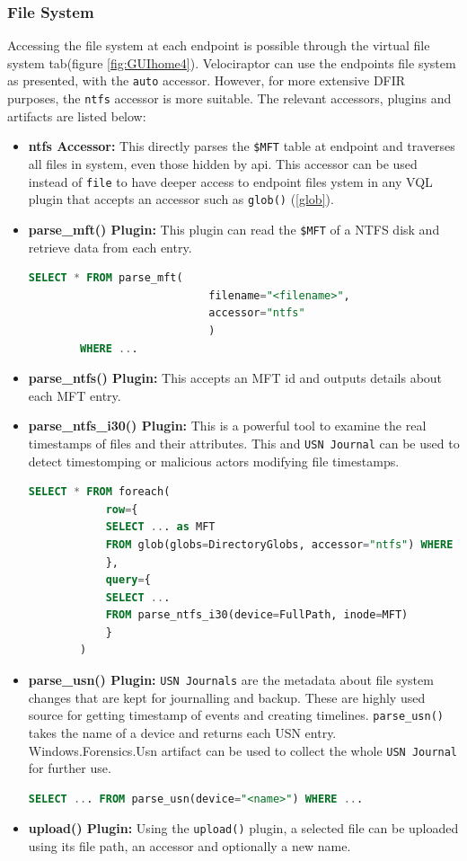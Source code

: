 \documentclass[a4paper, 11pt, oneside]{article} %
\begin{document}
\subsubsection{File System} 
Accessing the file system at each endpoint is possible through the virtual file system tab(figure \ref{fig:GUIhome4}). Velociraptor can use the endpoints file system as presented, with the \verb|auto| accessor. However, for more extensive DFIR purposes, the \verb|ntfs| accessor is more suitable. The relevant accessors, plugins and artifacts are listed  below:
\begin{itemize}
    \item \textbf{ntfs Accessor:} This directly parses the \verb|$MFT| table at endpoint and traverses all files in system, even those hidden by api. This accessor can be used instead of \verb|file| to have deeper access to endpoint files ystem in any VQL plugin that accepts an accessor such as \verb|glob()| (\ref{glob}).
    \item \textbf{parse\_mft() Plugin:} This plugin can read the \verb|$MFT| of a NTFS disk and retrieve data from each entry.
    \begin{lstlisting}[basicstyle=\ttfamily, breaklines=true, language=SQL]
        SELECT * FROM parse_mft(
                            filename="<filename>",
                            accessor="ntfs"
                            )
        WHERE ...
    \end{lstlisting}
    \item \textbf{parse\_ntfs() Plugin:} This accepts an MFT id and outputs details about each MFT entry.
    \item \textbf{parse\_ntfs\_i30() Plugin:} This is a powerful tool to examine the real timestamps of files and their attributes. This and \verb|USN Journal| can be used to detect timestomping or malicious actors modifying file timestamps.
    \begin{lstlisting}[basicstyle=\ttfamily, breaklines=true, language=SQL]
        SELECT * FROM foreach(
            row={
            SELECT ... as MFT
            FROM glob(globs=DirectoryGlobs, accessor="ntfs") WHERE ...
            },
            query={
            SELECT ...
            FROM parse_ntfs_i30(device=FullPath, inode=MFT)
            }
        )
    \end{lstlisting}
    \item \textbf{parse\_usn() Plugin:} \verb|USN Journals| are the metadata about file system changes that are kept for journalling and backup. These are highly used source for getting timestamp of events and creating timelines. \verb|parse_usn()| takes the name of a device and returns each USN entry. Windows.Forensics.Usn artifact can be used to collect the whole \verb|USN Journal| for further use.
    \begin{lstlisting}[basicstyle=\ttfamily, breaklines=true, language=SQL]
        SELECT ... FROM parse_usn(device="<name>") WHERE ...
    \end{lstlisting}
    \item \textbf{upload() Plugin:}\label{upload} Using the \verb|upload()| plugin, a selected file can be uploaded using its file path, an accessor and optionally a new name.
\end{itemize}
\end{document}
